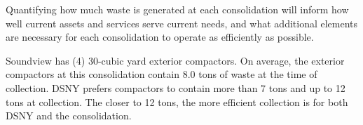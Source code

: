 
    Quantifying how much waste is generated at each consolidation will inform how well current assets and services serve current needs, and what additional elements are necessary for each consolidation to operate as efficiently as possible.
    
    Soundview has (4) 30-cubic yard exterior compactors. On average, the exterior compactors at this consolidation contain 8.0 tons of waste at the time of collection. DSNY prefers compactors to contain more than 7 tons and up to 12 tons at collection. The closer to 12 tons, the more efficient collection is for both DSNY and the consolidation.